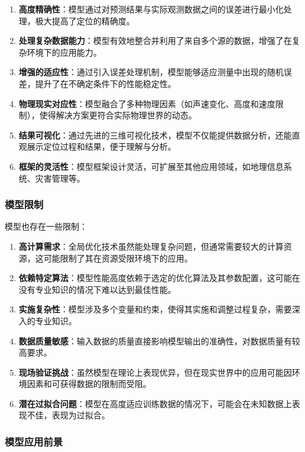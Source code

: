 \documentclass[withoutpreface,bwprint,12pt,a4paper]{cumcmthesis}
\begin{document}
\begin{enumerate}
    \item \textbf{高度精确性}：模型通过对预测结果与实际观测数据之间的误差进行最小化处理，极大提高了定位的精确度。
    \item \textbf{处理复杂数据能力}：模型有效地整合并利用了来自多个源的数据，增强了在复杂环境下的应用能力。
    \item \textbf{增强的适应性}：通过引入误差处理机制，模型能够适应测量中出现的随机误差，提升了在不确定条件下的性能稳定性。
    \item \textbf{物理现实对应性}：模型融合了多种物理因素（如声速变化、高度和速度限制），使得解决方案更符合实际物理世界的动态。
    \item \textbf{结果可视化}：通过先进的三维可视化技术，模型不仅能提供数据分析，还能直观展示定位过程和结果，便于理解与分析。
    \item \textbf{框架的灵活性}：模型框架设计灵活，可扩展至其他应用领域，如地理信息系统、灾害管理等。
\end{enumerate}

\subsubsection{模型限制}

模型也存在一些限制：

\begin{enumerate}
    \item \textbf{高计算需求}：全局优化技术虽然能处理复杂问题，但通常需要较大的计算资源，这可能限制了其在资源受限环境下的应用。
    \item \textbf{依赖特定算法}：模型性能高度依赖于选定的优化算法及其参数配置，这可能在没有专业知识的情况下难以达到最佳性能。
    \item \textbf{实施复杂性}：模型涉及多个变量和约束，使得其实施和调整过程复杂，需要深入的专业知识。
    \item \textbf{数据质量敏感}：输入数据的质量直接影响模型输出的准确性，对数据质量有较高要求。
    \item \textbf{现场验证挑战}：虽然模型在理论上表现优异，但在现实世界中的应用可能因环境因素和可获得数据的限制而受阻。
    \item \textbf{潜在过拟合问题}：模型在高度适应训练数据的情况下，可能会在未知数据上表现不佳，表现为过拟合。
\end{enumerate}

\subsubsection{模型应用前景}
\end{document}
